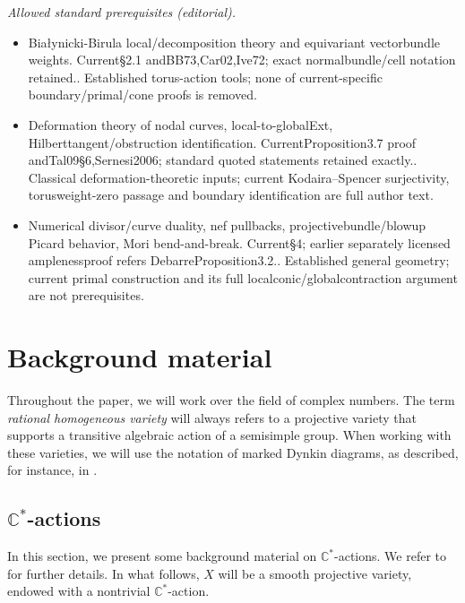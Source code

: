 \documentclass[10pt,a4paper]{article}
\numberwithin{equation}{section}
\theoremstyle{definition}
\theoremstyle{remark}
\def\C{{\mathbb C}}
\begin{document}
\noindent\textit{Allowed standard prerequisites (editorial).}\begin{itemize}
\item Białynicki-Birula local/decomposition theory and equivariant vectorbundle weights. Current§2.1 andBB73,Car02,Ive72; exact normalbundle/cell notation retained.. Established torus-action tools; none of current-specific boundary/primal/cone proofs is removed.
\item Deformation theory of nodal curves, local-to-globalExt, Hilberttangent/obstruction identification. CurrentProposition3.7 proof andTal09§6,Sernesi2006; standard quoted statements retained exactly.. Classical deformation-theoretic inputs; current Kodaira–Spencer surjectivity, torusweight-zero passage and boundary identification are full author text.
\item Numerical divisor/curve duality, nef pullbacks, projectivebundle/blowup Picard behavior, Mori bend-and-break. Current§4; earlier separately licensed amplenessproof refers DebarreProposition3.2.. Established general geometry; current primal construction and its full localconic/globalcontraction argument are not prerequisites.
\end{itemize}\medskip
\section{Background material}

Throughout the paper, we will work over the field of complex numbers. The term {\em rational homogeneous variety} will always refers to a projective variety that supports a transitive algebraic action of a semisimple group. When working with these varieties, we will use the notation of marked Dynkin diagrams, as described, for instance, in \cite[Section~3.1]{WORS5}.

\subsection{$\boldsymbol{\C^*}$-actions}\label{sec:c*}

In this section, we  present some background material on $\C^*$-actions. We refer to \cite{BB,CARRELL,WORS1} for further details. In what follows, $X$ will be a smooth projective variety, endowed with a nontrivial $\C^*$-action.
\end{document}
